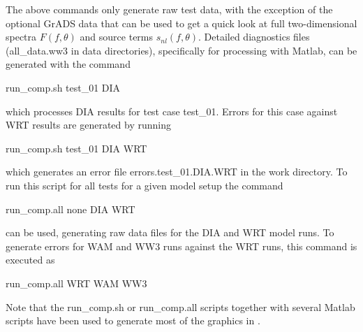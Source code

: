 \documentclass[12pt]{article}
\newcommand{\file}{\sf}
\begin{document}
The above commands only generate raw test data, with the exception of the
optional GrADS data that can be used to get a quick look at full
two-dimensional spectra $F(f,\theta)$ and source terms $s_{nl}(f,\theta)$.
Detailed diagnostics files ({\file all\_data.ww3} in data directories),
specifically for processing with Matlab, can be generated with the command
\begin{center}
{\file run\_comp.sh test\_01 DIA}
\end{center}
\noindent
which processes DIA results for test case {\file test\_01}. Errors for this
case against WRT results are generated by running
\begin{center}
{\file run\_comp.sh test\_01 DIA WRT}
\end{center}
\noindent
which generates an error file {\file errors.test\_01.DIA.WRT} in the work
directory. To run this script for all tests for a given model setup the
command
\begin{center}
{\file run\_comp.all none DIA WRT}
\end{center}
\noindent
can be used, generating raw data files for the DIA and WRT model runs. To
generate errors for WAM and WW3 runs against the WRT runs, this command is
executed as
\begin{center}
{\file run\_comp.all WRT WAM WW3}
\end{center}
\noindent
Note that the {\file run\_comp.sh} or {\file run\_comp.all} scripts together
with several Matlab scripts have been used to generate most of the graphics in
\cite{tol:MMABmanual}.
\end{document}
